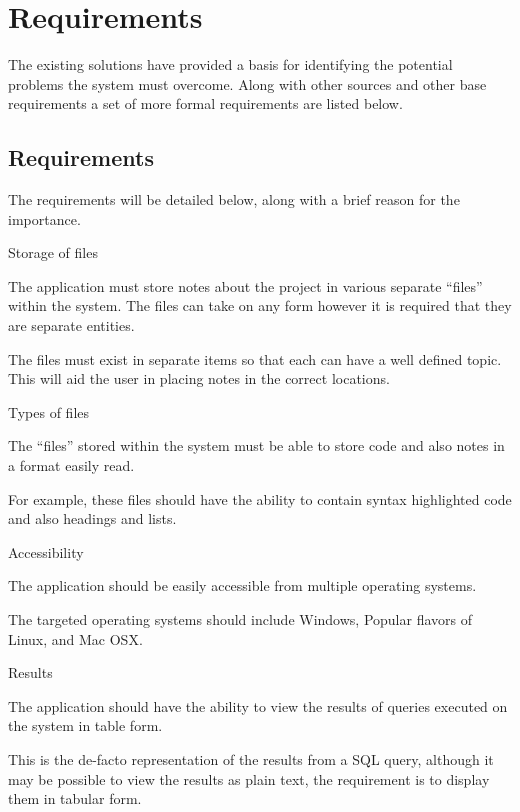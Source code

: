 \chapter{Requirements}\label{requirements}

The existing solutions have provided a basis for identifying the
potential problems the system must overcome. Along with other sources
and other base requirements a set of more formal requirements are listed
below.
\section{Requirements}

The requirements will be detailed below, along with a brief reason for the
importance.

\begin{requirement}{Storage of files}

\noindent
The application must store notes about the project in various separate
``files'' within the system. The files can take on any form however it is
required that they are separate entities.

The files must exist in separate items so that each can have a well defined
topic. This will aid the user in placing notes in the correct locations.
\end{requirement}

\begin{requirement}{Types of files}
\noindent

The ``files'' stored within the system must be able to store code and also
notes in a format easily read.

For example, these files should have the ability to contain syntax highlighted
code and also headings and lists.
\end{requirement}

\begin{requirement}{Accessibility}\label{requirement:accessible}
\noindent

The application should be easily accessible from multiple operating systems.

The targeted operating systems should include Windows, Popular flavors of
Linux, and Mac OSX.
\end{requirement}

\begin{requirement}{Results}
\noindent

The application should have the ability to view the results of queries executed
on the system in table form.

This is the de-facto representation of the results from a SQL query, although
it may be possible to view the results as plain text, the requirement is to
display them in tabular form.
\end{requirement}

